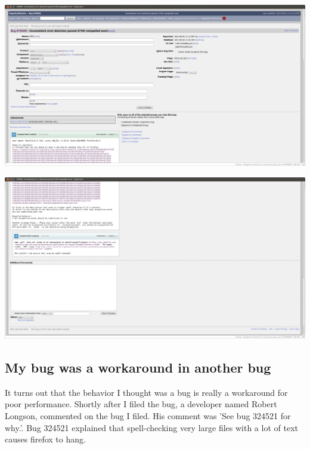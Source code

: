 \documentclass[12pt]{article}
\begin{document}
\includegraphics[width=6.5in]{cs419_part1}


\includegraphics[width=6.5in]{cs419_part2}

\subsection{My bug was a workaround in another bug}

It turns out that the behavior I thought was a bug is really a workaround for poor performance.
Shortly after I filed the bug, a developer named Robert Longson, commented on the bug I filed. His
comment was 'See bug 324521 for why.'. Bug 324521 explained that spell-checking very large files
with a lot of text causes firefox to hang.
\end{document}
